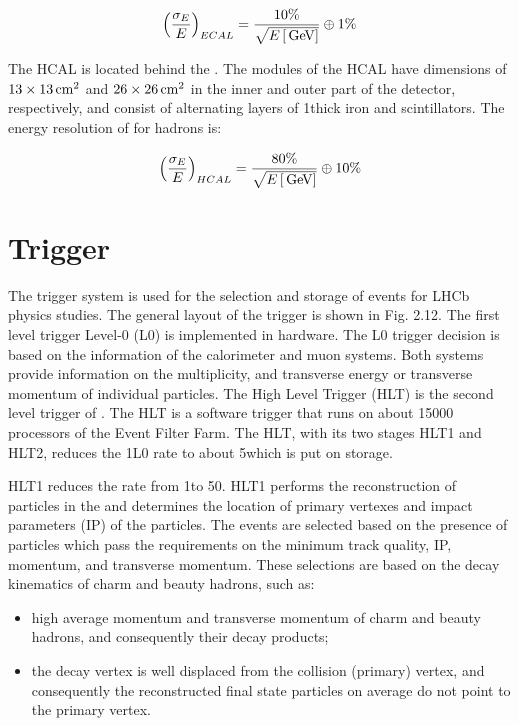 \begin{equation}
\left(\frac{\sigma_{E}}{E}\right)_{ECAL} = \frac{10\%}{\sqrt{E\left[\mathrm{\,Ge\kern -0.1em V}\right]}} \oplus 1\%
\label{eqn:ecal}
\end{equation}

The HCAL is located behind the \ecal. The modules of the HCAL have dimensions of
$13\times13\rm \,cm^2$ and $26\times26\rm \,cm^2$ in the inner and outer part of the
detector, respectively, and consist of alternating layers of 1\cm thick iron
and scintillators. The energy resolution of \hcal for hadrons is:

\begin{equation}
\left(\frac{\sigma_{E}}{E}\right)_{HCAL} = \frac{80\%}{\sqrt{E\left[\mathrm{\,Ge\kern -0.1em V}\right]}} \oplus 10\%
\label{eqn:ecal}
\end{equation}

\section{Trigger}

The \lhcb trigger system is used for the selection and storage of events for
LHCb physics studies. The general layout of the trigger is shown in Fig. 2.12.
The first level trigger Level-0 (L0) is implemented in hardware. The L0 trigger
decision is based on the information of the calorimeter and muon systems. Both
systems provide information on the multiplicity, and transverse energy \et or
transverse momentum \pt of individual particles. The High Level Trigger (HLT)
is the second level trigger of \lhcb. The HLT is a software trigger that runs on
about 15000 processors of the Event Filter Farm. The HLT, with its two stages
HLT1 and HLT2, reduces the 1\mhz L0 rate to about 5\khz which is put on
storage.

HLT1 reduces the rate from 1\mhz to 50\khz. HLT1 performs the reconstruction
of particles in the \velo and determines the location of primary vertexes and
impact parameters (IP) of the particles. The events are selected based on the
presence of particles which pass the requirements on the minimum track quality,
IP, momentum, and transverse momentum. These selections are based on the decay
kinematics of charm and beauty hadrons, such as:

\begin{itemize}
\item high average momentum and transverse momentum of charm and beauty
hadrons, and consequently their decay products;
\item the decay vertex is well displaced from the collision (primary) vertex, and
consequently the reconstructed final state particles on average do not point
to the primary vertex.
\end{itemize}

